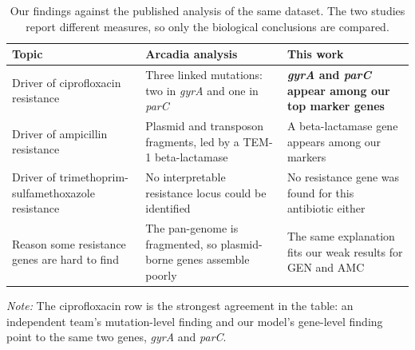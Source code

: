 \begin{table}[htb]
\centering
\caption{Our findings against the published analysis of the same dataset. The two
studies report different measures, so only the biological conclusions are
compared.}
\label{tab:arcadia}
\small
\begin{tabular}{|>{\raggedright\arraybackslash}p{3.3cm}|>{\raggedright\arraybackslash}p{5.3cm}|>{\raggedright\arraybackslash}p{5.3cm}|}
\hline
\textbf{Topic} & \textbf{Arcadia analysis \cite{york2025amr}} & \textbf{This work} \\ \hline
Driver of ciprofloxacin resistance &
Three linked mutations: two in \textit{gyrA} and one in \textit{parC} &
\textbf{\textit{gyrA} and \textit{parC} appear among our top marker genes} \\ \hline
Driver of ampicillin resistance &
Plasmid and transposon fragments, led by a TEM-1 beta-lactamase &
A beta-lactamase gene appears among our markers \\ \hline
Driver of trimethoprim-sulfamethoxazole resistance &
No interpretable resistance locus could be identified &
No resistance gene was found for this antibiotic either \\ \hline
Reason some resistance genes are hard to find &
The pan-genome is fragmented, so plasmid-borne genes assemble poorly &
The same explanation fits our weak results for GEN and AMC \\ \hline
\end{tabular}
\vspace{0.4em}

\noindent\footnotesize\textit{Note:} The ciprofloxacin row is the strongest agreement in the
table: an independent team's mutation-level finding and our model's gene-level finding point to
the same two genes, \textit{gyrA} and \textit{parC}.
\end{table}

